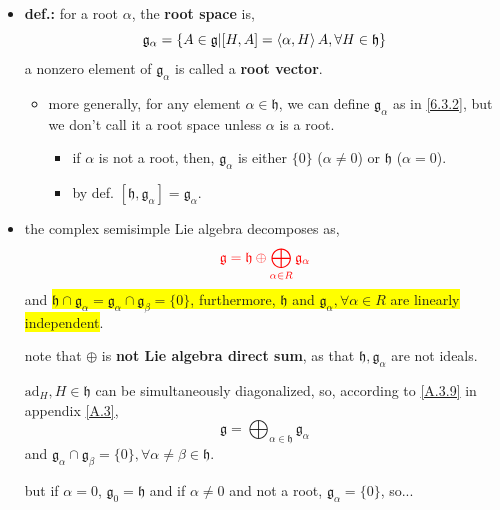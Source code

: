 \begin{itemize}
	\item \textbf{def.:} for a root $\alpha$, the \textbf{root space} is,
	\begin{equation} \label{6.3.2}
		\mathfrak{g}_\alpha = \{A \in \mathfrak{g} | [H, A] = \braket{\alpha, H} A, \forall H \in \mathfrak{h}\}
	\end{equation}
	a nonzero element of $\mathfrak{g}_\alpha$ is called a \textbf{root vector}.
	\begin{itemize}
		\item more generally, for any element $\alpha \in \mathfrak{h}$, we can define $\mathfrak{g}_\alpha$ as in \eqref{6.3.2}, but we don't call it a root space unless $\alpha$ is a root.
		\begin{itemize}
			\item if $\alpha$ is not a root, then, $\mathfrak{g}_\alpha$ is either $\{0\}$ ($\alpha \neq 0$) or $\mathfrak{h}$ ($\alpha = 0$).
			
			\item by def. $[\mathfrak{h}, \mathfrak{g}_\alpha] = \mathfrak{g}_\alpha$.
		\end{itemize}
	\end{itemize}
	
	\item the complex semisimple Lie algebra decomposes as,
	\begin{equation} \label{6.3.3}
		\mathcolor{red}{\mathfrak{g} = \mathfrak{h} \oplus \bigoplus_{\alpha \in R} \mathfrak{g}_\alpha}
	\end{equation}
	and \colorbox{yellow}{$\mathfrak{h} \cap \mathfrak{g}_\alpha = \mathfrak{g}_\alpha \cap \mathfrak{g}_\beta = \{0\}$, furthermore, $\mathfrak{h}$ and $\mathfrak{g}_\alpha, \forall \alpha \in R$ are linearly independent}.
	
	note that $\oplus$ is \textbf{not Lie algebra direct sum}, as that $\mathfrak{h}, \mathfrak{g}_\alpha$ are not ideals.
	
	\begin{tcolorbox}[title=proof:]
		$\mathrm{ad}_H, H \in \mathfrak{h}$ can be simultaneously diagonalized, so, according to \eqref{A.3.9} in appendix \ref{A.3},
		\begin{equation}
			\mathfrak{g} = \bigoplus_{\alpha \in \mathfrak{h}} \mathfrak{g}_\alpha
		\end{equation}
		and $\mathfrak{g}_\alpha \cap \mathfrak{g}_\beta = \{0\}, \forall \alpha \neq \beta \in \mathfrak{h}$.
		
		but if $\alpha = 0$, $\mathfrak{g}_0 = \mathfrak{h}$ and if $\alpha \neq 0$ and not a root, $\mathfrak{g}_\alpha = \{0\}$, so...
	\end{tcolorbox}
	

\end{itemize}

